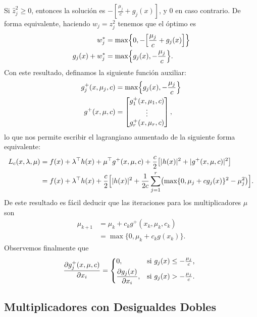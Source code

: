 Si \(\hat{z}_{j}^{2} \geq 0\), entonces la solución es \(-[\frac{\mu_{j}}{c} + g_{j}(x)]\), y \(0\) en caso contrario. De forma equivalente, haciendo \(w_{j} = z_{j}^{2}\) tenemos que el óptimo es
\begin{align*}
	w_{j}^{\ast}			&= \max \Bigl\{0, - \Bigl[\frac{\mu_{j}}{c} + g_{j}(x)\Bigr]\Bigr\} \\
	g_{j}(x) + w_{j}^{\ast}	&= \max \Bigl\{g_{j}(x), -\frac{\mu_{j}}{c}\Bigr\}.
\end{align*}
Con este resultado, definamos la siguiente función auxiliar:
\begin{align*}
	g_{j}^{+}(x, \mu_{j}, c)	&= \max \Bigl\{g_{j}(x), -\frac{\mu_{j}}{c}\Bigr\} \\
	g^{+}(x, \mu, c)			&= \begin{bmatrix} g_{1}^{+}(x,\mu_{1},c) \\ \vdots \\ g_{r}^{+}(x,\mu_{r},c) \end{bmatrix},
\end{align*}
lo que nos permite escribir el lagrangiano aumentado de la siguiente forma equivalente:
\begin{align*}
	L_{c}(x, \lambda, \mu)	&= f(x) + \lambda^{\top} h(x) + \mu^{\top} g^{+}(x, \mu, c) + \frac{c}{2} \bigl[\lvert h(x) \rvert^{2} + \lvert g^{+}(x, \mu, c) \rvert^{2}\bigr] \\
							&= f(x) + \lambda^{\top} h(x) + \frac{c}{2} \Bigl[\lvert h(x) \rvert^{2} + \frac{1}{2c} \sum_{j=1}^{r} \bigl(\max\{0, \mu_{j} + cg_{j}(x)\}^{2} - \mu_{j}^{2}\bigr)\Bigr].
\end{align*}
De este resultado es fácil deducir que las iteraciones para los multiplicadores \(\mu\) son
\begin{align*}
	\mu_{k+1}	&= \mu_{k} + c_{k} g^{+}(x_{k}, \mu_{k}, c_{k}) \\
				&= \max \{0, \mu_{k} + c_{k} g(x_{k})\}.
\end{align*}
Observemos finalmente que
\[\pdv{g_{j}^{+}(x, \mu, c)}{x_{i}} = \begin{dcases*}
	0,						& si \(g_{j}(x) \leq -\frac{\mu_{j}}{c}\), \\
	\pdv{g_{j}(x)}{x_{i}},	& si \(g_{j}(x) > -\frac{\mu_{j}}{c}\).
\end{dcases*}
\]

\subsection{Multiplicadores con Desigualdes Dobles}


